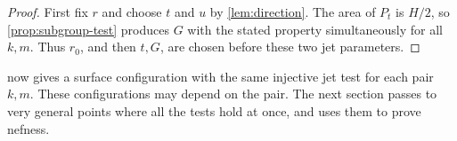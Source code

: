 \begin{proof}
First fix $r$ and choose $t$ and $u$ by \cref{lem:direction}. The area of $P_t$ is $H/2$, so \cref{prop:subgroup-test} produces $G$ with the stated property simultaneously for all $k,m$. Thus $r_0$, and then $t,G$, are chosen before these two jet parameters.
\end{proof}

 now gives a surface configuration with the same injective jet test for each pair $k,m$.  These configurations may depend on the pair.  The next section passes to very general points where all the tests hold at once, and uses them to prove nefness.
